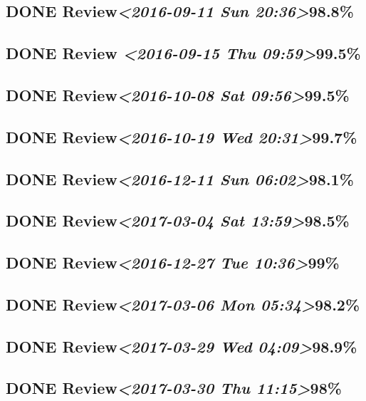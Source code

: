 \documentclass[11pt]{ctexart}
\begin{document}
\subsection{{\bfseries\sffamily DONE} Review\textit{<2016-09-11 Sun 20:36>}98.8\%}
\label{sec:org9af2df0}
\subsection{{\bfseries\sffamily DONE} Review \textit{<2016-09-15 Thu 09:59>}99.5\%}
\label{sec:orge4b20d6}
\subsection{{\bfseries\sffamily DONE} Review\textit{<2016-10-08 Sat 09:56>}99.5\%}
\label{sec:org6b9c1ab}
\subsection{{\bfseries\sffamily DONE} Review\textit{<2016-10-19 Wed 20:31>}99.7\%}
\label{sec:orgd0d5f62}
\subsection{{\bfseries\sffamily DONE} Review\textit{<2016-12-11 Sun 06:02>}98.1\%}
\label{sec:orgfd9c0f2}
\subsection{{\bfseries\sffamily DONE} Review\textit{<2017-03-04 Sat 13:59>}98.5\%}
\label{sec:org2432489}
\subsection{{\bfseries\sffamily DONE} Review\textit{<2016-12-27 Tue 10:36>}99\%}
\label{sec:org9609fa9}
\subsection{{\bfseries\sffamily DONE} Review\textit{<2017-03-06 Mon 05:34>}98.2\%}
\label{sec:org0f5025e}
\subsection{{\bfseries\sffamily DONE} Review\textit{<2017-03-29 Wed 04:09>}98.9\%}
\label{sec:org947a94c}
\subsection{{\bfseries\sffamily DONE} Review\textit{<2017-03-30 Thu 11:15>}98\%}
\label{sec:org03535fa}
\end{document}
